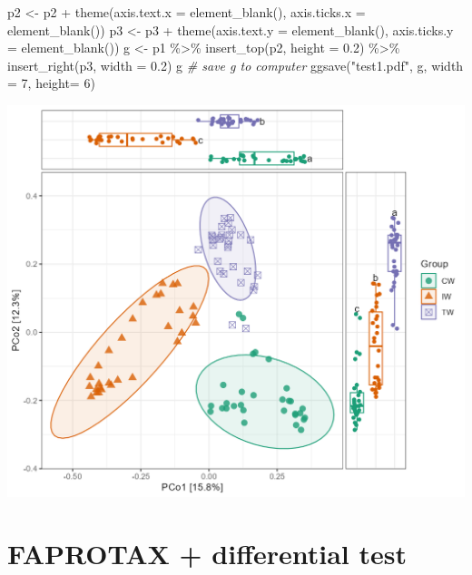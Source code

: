 \documentclass[
]{book}
\newenvironment{Shaded}{\begin{snugshade}}{\end{snugshade}}
\newcommand{\AttributeTok}[1]{\textcolor[rgb]{0.77,0.63,0.00}{#1}}
\newcommand{\CommentTok}[1]{\textcolor[rgb]{0.56,0.35,0.01}{\textit{#1}}}
\newcommand{\DecValTok}[1]{\textcolor[rgb]{0.00,0.00,0.81}{#1}}
\newcommand{\FloatTok}[1]{\textcolor[rgb]{0.00,0.00,0.81}{#1}}
\newcommand{\FunctionTok}[1]{\textcolor[rgb]{0.00,0.00,0.00}{#1}}
\newcommand{\NormalTok}[1]{#1}
\newcommand{\OtherTok}[1]{\textcolor[rgb]{0.56,0.35,0.01}{#1}}
\newcommand{\SpecialCharTok}[1]{\textcolor[rgb]{0.00,0.00,0.00}{#1}}
\newcommand{\StringTok}[1]{\textcolor[rgb]{0.31,0.60,0.02}{#1}}
\begin{document}
\begin{Shaded}
\begin{Highlighting}[]
\NormalTok{p2 }\OtherTok{\textless{}{-}}\NormalTok{ p2 }\SpecialCharTok{+} \FunctionTok{theme}\NormalTok{(}\AttributeTok{axis.text.x =} \FunctionTok{element\_blank}\NormalTok{(), }\AttributeTok{axis.ticks.x =} \FunctionTok{element\_blank}\NormalTok{())}
\NormalTok{p3 }\OtherTok{\textless{}{-}}\NormalTok{ p3 }\SpecialCharTok{+} \FunctionTok{theme}\NormalTok{(}\AttributeTok{axis.text.y =} \FunctionTok{element\_blank}\NormalTok{(), }\AttributeTok{axis.ticks.y =} \FunctionTok{element\_blank}\NormalTok{())}
\NormalTok{g }\OtherTok{\textless{}{-}}\NormalTok{ p1 }\SpecialCharTok{\%\textgreater{}\%} \FunctionTok{insert\_top}\NormalTok{(p2, }\AttributeTok{height =} \FloatTok{0.2}\NormalTok{) }\SpecialCharTok{\%\textgreater{}\%} \FunctionTok{insert\_right}\NormalTok{(p3, }\AttributeTok{width =} \FloatTok{0.2}\NormalTok{)}
\NormalTok{g}
\CommentTok{\# save g to computer}
\FunctionTok{ggsave}\NormalTok{(}\StringTok{"test1.pdf"}\NormalTok{, g, }\AttributeTok{width =} \DecValTok{7}\NormalTok{, }\AttributeTok{height=} \DecValTok{6}\NormalTok{)}
\end{Highlighting}
\end{Shaded}

\begin{center}\includegraphics[width=650px]{Images/Other_PCoA_boxplot2} \end{center}

\hypertarget{faprotax-differential-test}{%
\section{FAPROTAX + differential test}\label{faprotax-differential-test}}
\end{document}
